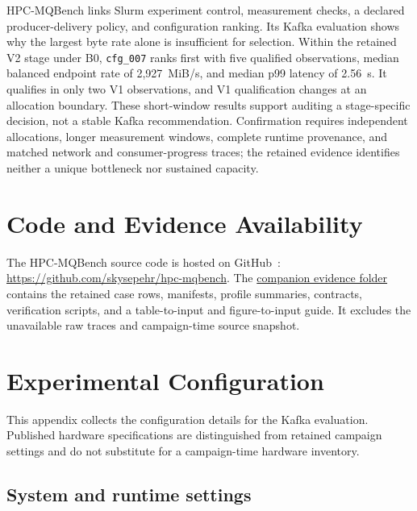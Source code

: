 \documentclass[10pt]{article}
\newcommand{\system}{HPC-MQBench}
\begin{document}
\system{} links Slurm experiment control, measurement checks, a declared
producer-delivery policy, and configuration ranking.  Its Kafka evaluation
shows why the largest byte rate alone is insufficient for selection.
Within the retained V2 stage under B0, \texttt{cfg\_007} ranks first with five
qualified observations, median balanced endpoint rate of 2,927~MiB/s, and
median p99 latency of 2.56~s. It qualifies in only two V1 observations, and V1
qualification changes at an allocation boundary. These short-window results
support auditing a stage-specific decision, not a stable Kafka recommendation.
Confirmation requires independent allocations, longer measurement windows,
complete runtime provenance, and matched network and consumer-progress traces;
the retained evidence identifies neither a unique bottleneck nor sustained capacity.


\section{Code and Evidence Availability}
\label{sec:availability}

The \system{} source code is hosted on GitHub~\cite{hpcmqbenchcode}:
\url{https://github.com/skysepehr/hpc-mqbench}. The
\href{https://github.com/skysepehr/hpc-mqbench/tree/kafka-paper-evidence-v1/Report/HPC_MQBench_Kafka_Evidence}{companion evidence folder}
contains the retained case rows, manifests, profile summaries, contracts,
verification scripts, and a table-to-input and figure-to-input guide. It
excludes the unavailable raw traces and campaign-time source snapshot.


\begingroup
\footnotesize
\setlength{\bibsep}{2pt plus 0.2ex}

\endgroup

\par\bigskip
\appendix
\section{Experimental Configuration}
\label{app:configuration}
\setcounter{table}{0}
\renewcommand{\thetable}{\thesection.\arabic{table}}

This appendix collects the configuration details for the Kafka evaluation.
Published hardware specifications are distinguished from retained campaign
settings and do not substitute for a campaign-time hardware inventory.

\subsection{System and runtime settings}
\end{document}
